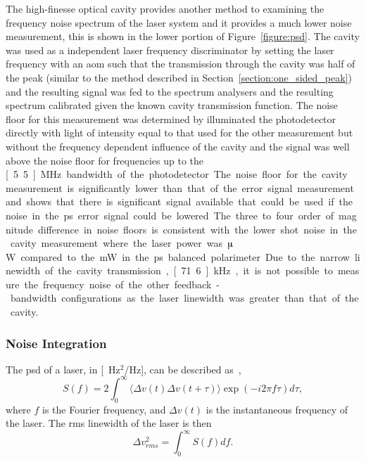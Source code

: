 The high-finesse optical cavity provides another method to examining the frequency noise spectrum of the laser system and it provides a much lower noise measurement, this is shown in the lower portion of Figure~\ref{figure:psd}.
The cavity was used as a independent laser frequency discriminator by setting the laser frequency with an \gls{aom} such that the transmission through the cavity was half of the peak (similar to the method described in Section~\ref{section:one_sided_peak}) and the resulting signal was fed to the spectrum analysers and the resulting spectrum calibrated given the known cavity transmission function.
The noise floor for this measurement was determined by illuminated the photodetector directly with light of intensity equal to that used for the other measurement but without the frequency dependent influence of the cavity and the signal was well above the noise floor for frequencies up to the \unit[5.5]{MHz} bandwidth of the photodetector.
The noise floor for the cavity measurement is significantly lower than that of the error signal measurement and shows that there is significant signal available that could be used if the noise in the \gls{ps} error signal could be lowered.
The three to four order of magnitude difference in noise floors is consistent with the lower shot noise in the cavity measurement where the laser power was \unit[10]{$\muup$W} compared to the \unit[1]{mW} in the \gls{ps} balanced polarimeter.
Due to the narrow linewidth of the cavity transmission, \unit[71.6]{kHz}, it is not possible to measure the frequency noise of the other feedback-bandwidth configurations as the laser linewidth was greater than that of the cavity.

\subsubsection{Noise Integration}

The \gls{psd} of a laser, in \unit[Hz$^2$/Hz], can be described as~\cite{turner_frequency_2002},
\begin{equation}
S(f)=2\int_0^\infty \langle\Delta v(t)\Delta v(t+\tau)\rangle\exp(-i2\pi f \tau)d\tau,
\end{equation}
where $f$ is the Fourier frequency, and $\Delta v (t)$ is the instantaneous frequency of the laser.
The \gls{rms} linewidth of the laser is then
\begin{equation}\label{equation:noise_integration}
\Delta v^2_{rms} = \int_0^\infty S(f) df.
\end{equation}

